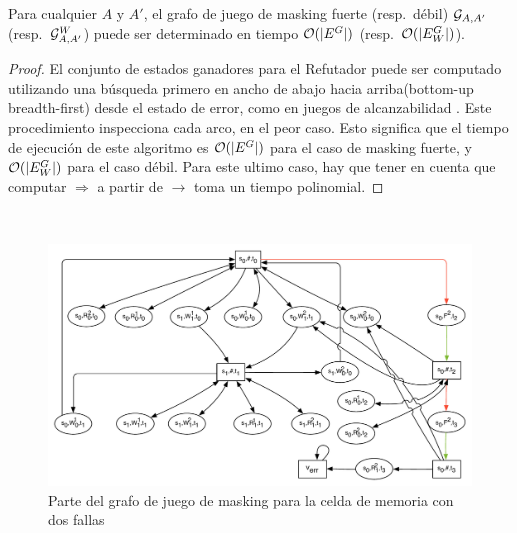 \begin{theorem}\label{thm:game-determined}
  Para cualquier $A$ y $A'$, el grafo de juego de masking fuerte (resp.\ débil) 
  $\mathcal{G}_{A, A'}$ (resp.\ $\mathcal{G}^W_{A,A'}$) puede ser determinado en tiempo $\mathcal{O}(|E^G|)$ (resp.\ $\mathcal{O}(|E_W^G|)$).
\end{theorem}
\begin{proof}
El conjunto de estados ganadores para el Refutador puede ser computado utilizando una búsqueda primero en ancho de abajo hacia arriba(bottom-up breadth-first) desde el estado de error, como en juegos de alcanzabilidad \cite{Jurd11}. 
Este procedimiento inspecciona cada arco, en el peor caso. Esto significa que el tiempo de ejecución de este algoritmo es $\mathcal{O}(|E^G|)$ para el caso de masking fuerte, y $\mathcal{O}(|E_W^G|)$ para el caso débil. Para este ultimo caso, hay que tener en cuenta que computar  
$\Rightarrow$ a partir de $\rightarrow$ toma un tiempo polinomial.
\qedhere
\end{proof} \\
\begin{figure} [ht]
\begin{center}
    \includegraphics[scale=0.5]{Figs/ex1_cell_mem_game_graph_two_faults-eps-converted-to.pdf} 
    \caption{Parte del grafo de juego de masking para la celda de memoria con dos fallas}
    \label{figure:exam_2_mem_cell_gg_two_faults}
\end{center}
\end{figure}

